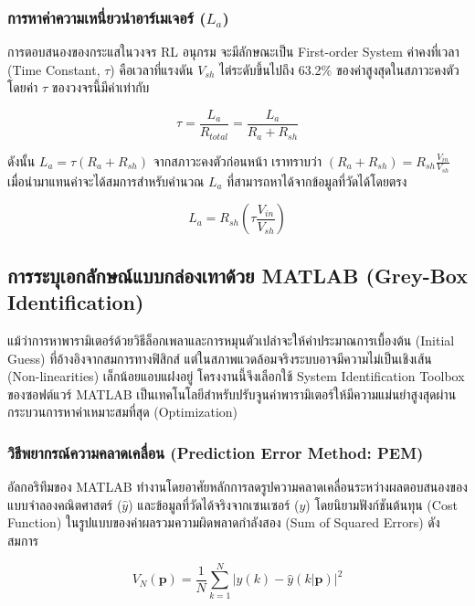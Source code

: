 \subsubsection{การหาค่าความเหนี่ยวนำอาร์เมเจอร์ ($L_a$)}
การตอบสนองของกระแสในวงจร RL อนุกรม จะมีลักษณะเป็น First-order System ค่าคงที่เวลา (Time Constant, $\tau$) คือเวลาที่แรงดัน $V_{sh}$ ไต่ระดับขึ้นไปถึง 63.2\% ของค่าสูงสุดในสภาวะคงตัว โดยค่า $\tau$ ของวงจรนี้มีค่าเท่ากับ

\begin{equation}
    \tau = \frac{L_a}{R_{total}} = \frac{L_a}{R_a + R_{sh}}
\end{equation}

\noindent ดังนั้น $L_a = \tau(R_a + R_{sh})$ 
จากสภาวะคงตัวก่อนหน้า เราทราบว่า $(R_a + R_{sh}) = R_{sh}\frac{V_{in}}{V_{sh}}$ เมื่อนำมาแทนค่าจะได้สมการสำหรับคำนวณ $L_a$ ที่สามารถหาได้จากข้อมูลที่วัดได้โดยตรง

\begin{equation}
    L_a = R_{sh} \left( \tau \frac{V_{in}}{V_{sh}} \right)
    \label{eq:calc_La}
\end{equation}

\subsection{การระบุเอกลักษณ์แบบกล่องเทาด้วย MATLAB (Grey-Box Identification)}
\label{subsec:matlab_sysid}

แม้ว่าการหาพารามิเตอร์ด้วยวิธีล็อกเพลาและการหมุนตัวเปล่าจะให้ค่าประมาณการเบื้องต้น (Initial Guess) ที่อ้างอิงจากสมการทางฟิสิกส์ แต่ในสภาพแวดล้อมจริงระบบอาจมีความไม่เป็นเชิงเส้น (Non-linearities) เล็กน้อยแอบแฝงอยู่ 
โครงงานนี้จึงเลือกใช้ System Identification Toolbox ของซอฟต์แวร์ MATLAB เป็นเทคโนโลยีสำหรับปรับจูนค่าพารามิเตอร์ให้มีความแม่นยำสูงสุดผ่านกระบวนการหาค่าเหมาะสมที่สุด (Optimization)

\subsubsection{วิธีพยากรณ์ความคลาดเคลื่อน (Prediction Error Method: PEM)}
อัลกอริทึมของ MATLAB ทำงานโดยอาศัยหลักการลดรูปความคลาดเคลื่อนระหว่างผลตอบสนองของแบบจำลองคณิตศาสตร์ ($\hat{y}$) และข้อมูลที่วัดได้จริงจากเซนเซอร์ ($y$) โดยนิยามฟังก์ชันต้นทุน (Cost Function) ในรูปแบบของค่าผลรวมความผิดพลาดกำลังสอง (Sum of Squared Errors) ดังสมการ

\begin{equation}
    V_N(\mathbf{p}) = \frac{1}{N} \sum_{k=1}^N \left| y(k) - \hat{y}(k | \mathbf{p}) \right|^2
    \label{eq:pem_cost}
\end{equation}

